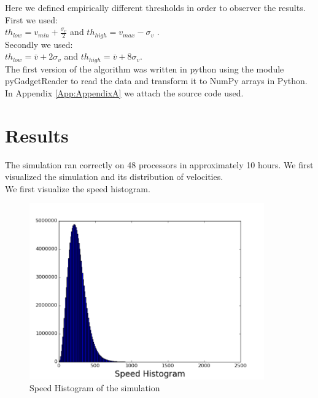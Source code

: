 \documentclass[12pt]{article}
\begin{document}
Here we defined empirically different thresholds in order to observer the results. \\
First we used:  \\
$th_{low} = v_{min} + \frac{\sigma_{v}}{2} $ and $th_{high} = v_{max}  - \sigma_{v}$ .\\
Secondly we used: \\
$th_{low} = \bar{v} + 2  \sigma_{v} $ and $th_{high} = \bar{v}  +  8 \sigma_{v}$.\\

The first version of the algorithm was written in python using the module
pyGadgetReader \cite{thompson_pygadgetreader_2014ascl_soft11001T} to read the
data and transform it to NumPy arrays in Python. In Appendix \ref{App:AppendixA} we attach the source code used.


\section{Results}

The simulation ran correctly on 48 processors in approximately 10 hours. We first visualized the simulation and its distribution of velocities. \\

We first visualize the speed histogram.\\

\begin{figure}[ht]
\begin{center}
\includegraphics[width=0.9\textwidth]{graphs/hist_vel.png} %
\caption{Speed Histogram of the simulation}
\label{fg:hist_vel}
\end{center}
\end{figure}
\FloatBarrier
\end{document}
